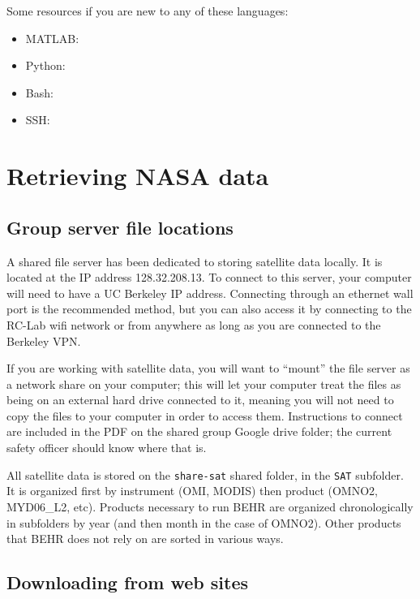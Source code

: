 \documentclass[12pt]{article}
\begin{document}
	Some resources if you are new to any of these languages:
	\begin{itemize}
		\item MATLAB:
		\item Python:
		\item Bash:
		\item SSH:
	\end{itemize}

\section{Retrieving NASA data}
	\subsection{Group server file locations}\label{sec:file-server}
		A shared file server has been dedicated to storing satellite data locally. It is located at the IP address 128.32.208.13. To connect to this server, your computer will need to have a UC Berkeley IP address.  Connecting through an ethernet wall port is the recommended method, but you can also access it by connecting to the RC-Lab wifi network or from anywhere as long as you are connected to the Berkeley VPN.  
		
		If you are working with satellite data, you will want to ``mount'' the file server as a network share on your computer; this will let your computer treat the files as being on an external hard drive connected to it, meaning you will not need to copy the files to your computer in order to access them.  Instructions to connect are included in the PDF on the shared group Google drive folder; the current safety officer should know where that is.
		
		All satellite data is stored on the \texttt{share-sat} shared folder, in the \texttt{SAT} subfolder. It is organized first by instrument (OMI, MODIS) then product (OMNO2, MYD06\_L2, etc). Products necessary to run BEHR are organized chronologically in subfolders by year (and then month in the case of OMNO2). Other products that BEHR does not rely on are sorted in various ways.
	
	\subsection{Downloading from web sites}
	
\end{document}
